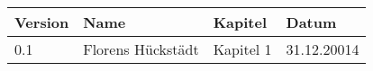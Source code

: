 \begin{tabularx}{\textwidth}{|l|X|l|l|} \hline
       \textbf{Version}  	& \textbf{Name}   	& \textbf{Kapitel}  & \textbf{Datum}\\ \hline
       0.1           		& Florens Hückstädt & Kapitel 1 		& 31.12.20014\\
        \hline
\end{tabularx}